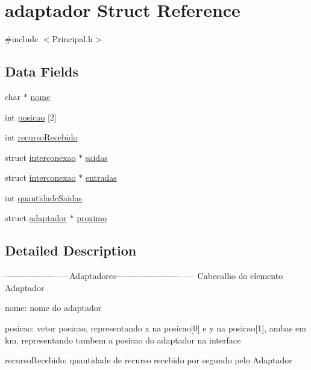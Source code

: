 \hypertarget{structadaptador}{\section{adaptador Struct Reference}
\label{structadaptador}
}


{\ttfamily \#include $<$Principal.\-h$>$}

\subsection*{Data Fields}
\begin{DoxyCompactItemize}
\item 
char $\ast$ \hyperlink{structadaptador_ae2a0f66178bb1c4d42e2b70ec9426ccb}{nome}
\item 
int \hyperlink{structadaptador_a7e30d633898517077a4363ad6fade5b6}{posicao} \mbox{[}2\mbox{]}
\item 
int \hyperlink{structadaptador_a34541bd6c7eec1f2049716b02efe9572}{recurso\-Recebido}
\item 
struct \hyperlink{structinterconexao}{interconexao} $\ast$ \hyperlink{structadaptador_a788fad8a0ec948140f9c2a340be29a09}{saidas}
\item 
struct \hyperlink{structinterconexao}{interconexao} $\ast$ \hyperlink{structadaptador_ae28777a0a252764c89fe126c8d7fba4a}{entradas}
\item 
int \hyperlink{structadaptador_a135fa6c241ccfd74d2e8413ebefc0579}{quantidade\-Saidas}
\item 
struct \hyperlink{structadaptador}{adaptador} $\ast$ \hyperlink{structadaptador_a13b5e7e3587fb01bede3f317405b5af2}{proximo}
\end{DoxyCompactItemize}


\subsection{Detailed Description}
-\/-\/-\/-\/-\/-\/-\/-\/-\/-\/-\/-\/-\/-\/-\/-\/-\/------Adaptadores-\/-\/-\/-\/-\/-\/-\/-\/-\/-\/-\/-\/-\/-\/-\/-\/-\/-\/-\/-\/-\/-\/------ Cabecalho do elemento Adaptador

nome\-: nome do adaptador

posicao\-: vetor posicao, representando x na posicao\mbox{[}0\mbox{]} e y na posicao\mbox{[}1\mbox{]}, ambas em km, representando tambem a posicao do adaptador na interface

recurso\-Recebido\-: quantidade de recurso recebido por segundo pelo Adaptador

